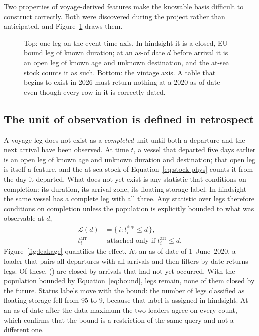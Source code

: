 Two properties of voyage-derived features make the knowable basis difficult to
construct correctly. Both were discovered during the project rather than
anticipated, and Figure~\ref{fig:knowable} draws them.

\begin{figure}[tb]
\centering
\resizebox{0.66\textwidth}{!}{}
\caption{Top: one leg on the event-time axis. In hindsight it is a closed, EU-bound
leg of known duration; at an as-of date $d$ before arrival it is an open leg of
known age and unknown destination, and the at-sea stock counts it as such. Bottom:
the vintage axis. A table that begins to exist in 2026 must return nothing at a
2020 as-of date even though every row in it is correctly dated.}
\label{fig:knowable}
\end{figure}

\subsection{The unit of observation is defined in retrospect}

A voyage leg does not exist as a \emph{completed} unit until both a departure and
the next arrival have been observed. At time $t$, a vessel that departed five days
earlier is an open leg of known age and unknown duration and destination; that
open leg is itself a feature, and the at-sea stock of
Equation~\eqref{eq:stock-phys} counts it from the day it departed. What does not
yet exist is any statistic that conditions on completion: its duration, its arrival
zone, its floating-storage label. In hindsight the same vessel has a complete leg
with all three. Any statistic over legs therefore conditions on completion unless
the population is explicitly bounded to what was observable at $d$,
\begin{equation}
\begin{aligned}
  \mathcal{L}(d) &= \{\, i : t^{\mathrm{dep}}_i \le d \,\},\\
  t^{\mathrm{arr}}_i &\text{ attached only if } t^{\mathrm{arr}}_i \le d .
\end{aligned}
\label{eq:bound}
\end{equation}
Figure~\ref{fig:leakage} quantifies the effect. At an as-of date of 1~June~2020, a
loader that pairs all departures with all arrivals and then filters by date returns
\leakNaive{} legs. Of these, \leakFutureClosed{} (\leakFutureShare) are closed by
arrivals that had not yet occurred. With the population bounded by
Equation~\eqref{eq:bound}, \leakBounded{} legs remain, none of them closed by the
future. Status labels move with the bound: the number of legs classified as
floating storage fell from 95 to 9, because that label is assigned in hindsight. At
an as-of date after the data maximum the two loaders agree on every count, which
confirms that the bound is a restriction of the same query and not a different one.

